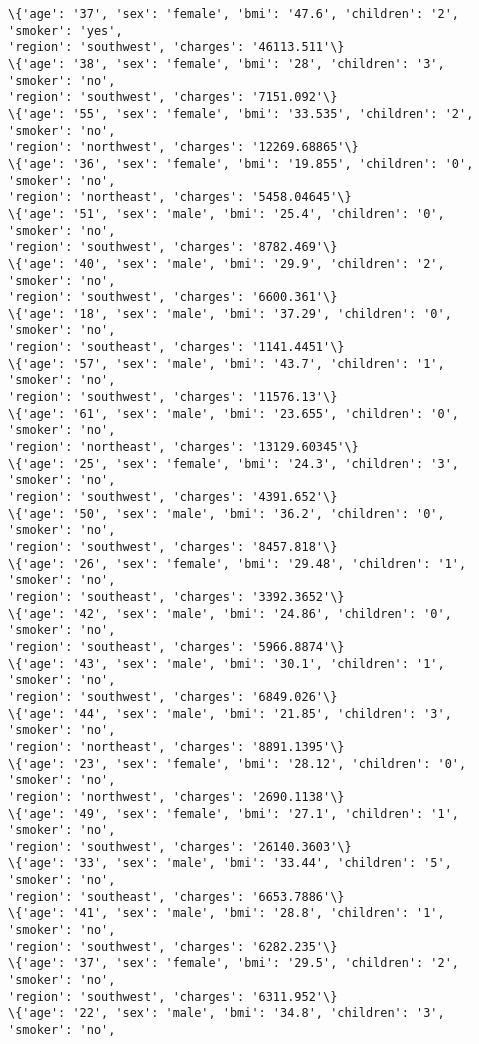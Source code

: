 \documentclass[11pt]{article}
\begin{document}
\begin{Verbatim}[commandchars=\\\{\}]
\{'age': '37', 'sex': 'female', 'bmi': '47.6', 'children': '2', 'smoker': 'yes',
'region': 'southwest', 'charges': '46113.511'\}
\{'age': '38', 'sex': 'female', 'bmi': '28', 'children': '3', 'smoker': 'no',
'region': 'southwest', 'charges': '7151.092'\}
\{'age': '55', 'sex': 'female', 'bmi': '33.535', 'children': '2', 'smoker': 'no',
'region': 'northwest', 'charges': '12269.68865'\}
\{'age': '36', 'sex': 'female', 'bmi': '19.855', 'children': '0', 'smoker': 'no',
'region': 'northeast', 'charges': '5458.04645'\}
\{'age': '51', 'sex': 'male', 'bmi': '25.4', 'children': '0', 'smoker': 'no',
'region': 'southwest', 'charges': '8782.469'\}
\{'age': '40', 'sex': 'male', 'bmi': '29.9', 'children': '2', 'smoker': 'no',
'region': 'southwest', 'charges': '6600.361'\}
\{'age': '18', 'sex': 'male', 'bmi': '37.29', 'children': '0', 'smoker': 'no',
'region': 'southeast', 'charges': '1141.4451'\}
\{'age': '57', 'sex': 'male', 'bmi': '43.7', 'children': '1', 'smoker': 'no',
'region': 'southwest', 'charges': '11576.13'\}
\{'age': '61', 'sex': 'male', 'bmi': '23.655', 'children': '0', 'smoker': 'no',
'region': 'northeast', 'charges': '13129.60345'\}
\{'age': '25', 'sex': 'female', 'bmi': '24.3', 'children': '3', 'smoker': 'no',
'region': 'southwest', 'charges': '4391.652'\}
\{'age': '50', 'sex': 'male', 'bmi': '36.2', 'children': '0', 'smoker': 'no',
'region': 'southwest', 'charges': '8457.818'\}
\{'age': '26', 'sex': 'female', 'bmi': '29.48', 'children': '1', 'smoker': 'no',
'region': 'southeast', 'charges': '3392.3652'\}
\{'age': '42', 'sex': 'male', 'bmi': '24.86', 'children': '0', 'smoker': 'no',
'region': 'southeast', 'charges': '5966.8874'\}
\{'age': '43', 'sex': 'male', 'bmi': '30.1', 'children': '1', 'smoker': 'no',
'region': 'southwest', 'charges': '6849.026'\}
\{'age': '44', 'sex': 'male', 'bmi': '21.85', 'children': '3', 'smoker': 'no',
'region': 'northeast', 'charges': '8891.1395'\}
\{'age': '23', 'sex': 'female', 'bmi': '28.12', 'children': '0', 'smoker': 'no',
'region': 'northwest', 'charges': '2690.1138'\}
\{'age': '49', 'sex': 'female', 'bmi': '27.1', 'children': '1', 'smoker': 'no',
'region': 'southwest', 'charges': '26140.3603'\}
\{'age': '33', 'sex': 'male', 'bmi': '33.44', 'children': '5', 'smoker': 'no',
'region': 'southeast', 'charges': '6653.7886'\}
\{'age': '41', 'sex': 'male', 'bmi': '28.8', 'children': '1', 'smoker': 'no',
'region': 'southwest', 'charges': '6282.235'\}
\{'age': '37', 'sex': 'female', 'bmi': '29.5', 'children': '2', 'smoker': 'no',
'region': 'southwest', 'charges': '6311.952'\}
\{'age': '22', 'sex': 'male', 'bmi': '34.8', 'children': '3', 'smoker': 'no',

\end{Verbatim}
\end{document}
